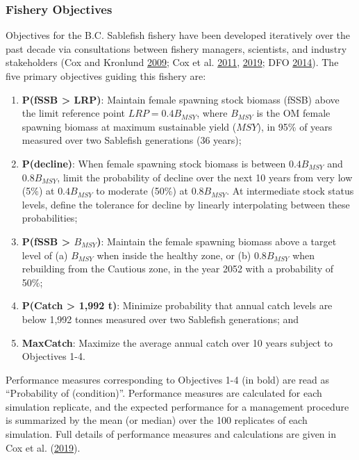 \documentclass[11pt]{book}
\begin{document}
\hypertarget{fishery-objectives}{%
\subsubsection{Fishery Objectives}\label{fishery-objectives}}

Objectives for the B.C. Sablefish fishery have been developed iteratively over the past decade via consultations between fishery managers, scientists, and industry stakeholders (Cox and Kronlund \protect\hyperlink{ref-cox2009evaluation}{2009}; Cox et al. \protect\hyperlink{ref-cox2011management}{2011}, \protect\hyperlink{ref-cox2019evaluating}{2019}; DFO \protect\hyperlink{ref-dfo2014performanc}{2014}). The five primary objectives guiding this fishery are:
\begin{enumerate}
\def\labelenumi{\arabic{enumi}.}

\item
  \textbf{P(fSSB \textgreater{} LRP)}: Maintain female spawning stock biomass (fSSB) above the limit reference point \(LRP = 0.4B_{MSY}\), where \(B_{MSY}\) is the OM female spawning biomass at maximum sustainable yield (\(MSY\)), in 95\% of years measured over two Sablefish generations (36 years);
\item
  \textbf{P(decline)}: When female spawning stock biomass is between \(0.4B_{MSY}\) and \(0.8B_{MSY}\), limit the probability of decline over the next 10 years from very low (5\%) at \(0.4B_{MSY}\) to moderate (50\%) at \(0.8B_{MSY}\). At intermediate stock status levels, define the tolerance for decline by linearly interpolating between these probabilities;
\item
  \textbf{P(fSSB \textgreater{} \(B_{MSY}\))}: Maintain the female spawning biomass above a target level of (a) \(B_{MSY}\) when inside the healthy zone, or (b) \(0.8B_{MSY}\) when rebuilding from the Cautious zone, in the year 2052 with a probability of 50\%;
\item
  \textbf{P(Catch \textgreater{} 1,992 t)}: Minimize probability that annual catch levels are below 1,992 tonnes measured over two Sablefish generations; and
\item
  \textbf{MaxCatch}: Maximize the average annual catch over 10 years subject to Objectives 1-4.
\end{enumerate}
Performance measures corresponding to Objectives 1-4 (in bold) are read as ``Probability of (condition)''. Performance measures are calculated for each simulation replicate, and the expected performance for a management procedure is summarized by the mean (or median) over the 100 replicates of each simulation. Full details of performance measures and calculations are given in Cox et al. (\protect\hyperlink{ref-cox2019evaluating}{2019}).
\end{document}
